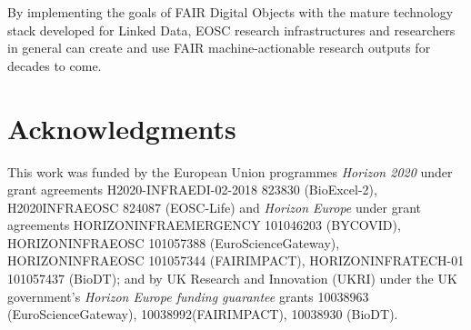\documentclass[fleqn,10pt,NOlineno]{wlpeerjlua}
\begin{document}
By implementing the goals of FAIR Digital Objects with the mature technology stack developed for Linked Data, EOSC research infrastructures and researchers in general can create and use FAIR machine-actionable research outputs for decades to come.

\section*{Acknowledgments}

This work was funded by the European Union programmes \emph{Horizon 2020} under grant agreements H2020-INFRAEDI-02-2018 823830 (BioExcel-2), H2020\-INFRAEOSC 824087 (EOSC-Life) and \emph{Horizon Europe} under grant agreements HORIZON\-INFRA\-EMERGENCY 101046203 (BY\-COVID), HORIZON\-INFRA\-EOSC 101057388 (EuroScienceGateway), HORIZON\-INFRA\-EOSC 101057344 (FAIR\-IMPACT), HORIZON\-INFRA\-TECH-01 101057437 (BioDT); and by UK Research and Innovation (UKRI) under the UK government’s \emph{Horizon Europe funding guarantee} grants 10038963 (EuroScienceGateway), 10038992(FAIR\-IMPACT), 10038930 (BioDT).


%
\def\UrlFont{\small}

\printbibliography

\printshorthands[heading=fdobibliography]


\end{document}
